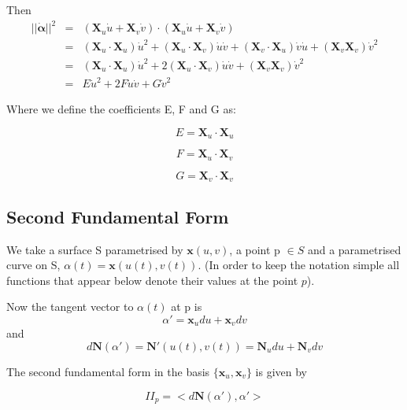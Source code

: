 Then 
\begin{eqnarray}
\nonumber
||\mathbf{\dot{\alpha}}||^2 &=& (\mathbf X_u \dot u+ \mathbf X_v \dot v) \cdot (\mathbf X_u \dot u+ \mathbf X_v \dot v) \\
\nonumber
&=&(\mathbf X_u \cdot \mathbf X_u)\dot{u}^2 +(\mathbf X_u \cdot \mathbf X_v)\dot{u}\dot{v} + (\mathbf X_v \cdot \mathbf X_u)\dot{v}\dot{u} + (\mathbf X_v \mathbf X_v)\dot{v}^2 \\
\nonumber
&=&(\mathbf X_u \cdot \mathbf X_u)\dot{u}^2 + 2(\mathbf X_u \cdot \mathbf X_v)\dot{u}\dot{v} + (\mathbf X_v \mathbf X_v)\dot{v}^2 \\
\nonumber
&=& E\dot{u}^2 + 2F\dot{u}\dot{v} + G\dot{v}^2
\end{eqnarray}

Where we define the coefficients E, F and G as:

\begin{displaymath}
E = \mathbf X_{u} \cdot \mathbf X_u
\end{displaymath}

\begin{displaymath}
F = \mathbf X_{u} \cdot \mathbf X_v
\end{displaymath}

\begin{displaymath}
G = \mathbf X_{v} \cdot \mathbf X_v
\end{displaymath}


\subsection{Second Fundamental Form}
We take a surface S parametrised by $\mathbf x(u,v)$, a point p $\in S$ and a parametrised curve on S, $\alpha (t) = \mathbf x(u(t),v(t))$. (In order to keep the notation simple all functions that appear below denote their values at the point $p$).

Now the tangent vector to $\alpha (t)$ at p is 
\begin{displaymath}
\alpha ' = \mathbf x_u du+ \mathbf x_v dv
\end{displaymath}
and 
\begin{displaymath}
d\mathbf N(\alpha ')=\mathbf N'(u(t),v(t))=\mathbf N_udu+\mathbf N_vdv
\end{displaymath}

The second fundamental form in the basis $\{ \mathbf x_u, \mathbf x_v \}$ is given by

\begin{displaymath}
II_p = <d\mathbf N(\alpha'),\alpha'> 
\end{displaymath}

